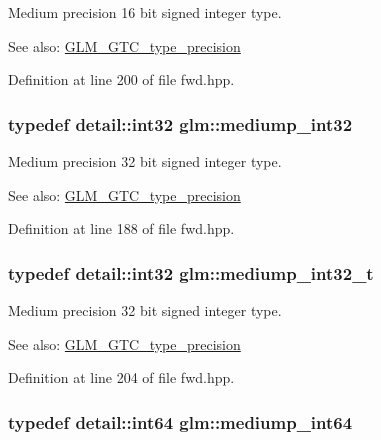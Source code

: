 Medium precision 16 bit signed integer type. \begin{Desc}
\item[See also:]\hyperlink{group__gtc__type__precision}{GLM\_\-GTC\_\-type\_\-precision} \end{Desc}


Definition at line 200 of file fwd.hpp.\hypertarget{group__gtc__type__precision_g0660a752402702f420f13c686a7fff29}{
\subsubsection[mediump\_\-int32]{\setlength{\rightskip}{0pt plus 5cm}typedef detail::int32 {\bf glm::mediump\_\-int32}}}
\label{group__gtc__type__precision_g0660a752402702f420f13c686a7fff29}


Medium precision 32 bit signed integer type. \begin{Desc}
\item[See also:]\hyperlink{group__gtc__type__precision}{GLM\_\-GTC\_\-type\_\-precision} \end{Desc}


Definition at line 188 of file fwd.hpp.\hypertarget{group__gtc__type__precision_gfd9b4bd9e4465aec63351b59100692c4}{
\subsubsection[mediump\_\-int32\_\-t]{\setlength{\rightskip}{0pt plus 5cm}typedef detail::int32 {\bf glm::mediump\_\-int32\_\-t}}}
\label{group__gtc__type__precision_gfd9b4bd9e4465aec63351b59100692c4}


Medium precision 32 bit signed integer type. \begin{Desc}
\item[See also:]\hyperlink{group__gtc__type__precision}{GLM\_\-GTC\_\-type\_\-precision} \end{Desc}


Definition at line 204 of file fwd.hpp.\hypertarget{group__gtc__type__precision_g603c695fe5cd677d3f72a81343e19a74}{
\subsubsection[mediump\_\-int64]{\setlength{\rightskip}{0pt plus 5cm}typedef detail::int64 {\bf glm::mediump\_\-int64}}}
\label{group__gtc__type__precision_g603c695fe5cd677d3f72a81343e19a74}


